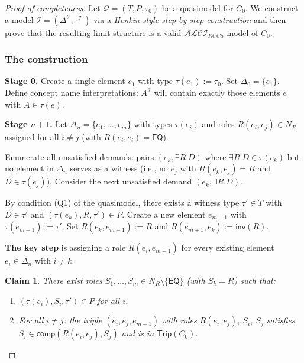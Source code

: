 \documentclass[a4paper,11pt]{article}
\newtheorem{claim}[theorem]{Claim}
\theoremstyle{definition}
\newcommand{\ALCIRCC}[1]{\ensuremath{\mathcal{ALCI}_{\mathit{RCC#1}}}}
\newcommand{\NR}{\ensuremath{N_R}}
\newcommand{\DeltaI}{\ensuremath{\Delta^{\mathcal{I}}}}
\newcommand{\interp}{\ensuremath{\mathcal{I}}}
\newcommand{\EQ}{\ensuremath{\mathsf{EQ}}}
\newcommand{\inv}{\ensuremath{\mathsf{inv}}}
\newcommand{\comp}{\ensuremath{\mathsf{comp}}}
\newcommand{\Trip}{\ensuremath{\mathsf{Trip}}}
\begin{document}
\begin{proof}[Proof of completeness]
Let $\mathcal{Q} = (T, P, \tau_0)$ be a quasimodel for $C_0$.  We
construct a model $\interp = (\DeltaI, \cdot^{\interp})$ via a
\emph{Henkin-style step-by-step construction} and then prove that the
resulting limit structure is a valid $\ALCIRCC{5}$ model of $C_0$.

\subsubsection*{The construction}

\medskip\noindent\textbf{Stage 0.}\;
Create a single element $e_1$ with type $\tau(e_1) := \tau_0$.
Set $\Delta_0 = \{e_1\}$.  Define concept name interpretations:
$A^{\interp}$ will contain exactly those elements $e$ with $A \in
\tau(e)$.

\medskip\noindent\textbf{Stage $n+1$.}\;
Let $\Delta_n = \{e_1, \ldots, e_m\}$ with types $\tau(e_i)$ and
roles $R(e_i, e_j) \in \NR$ assigned for all $i \neq j$ (with
$R(e_i, e_i) = \EQ$).

Enumerate all unsatisfied demands: pairs $(e_k, \exists R.D)$ where
$\exists R.D \in \tau(e_k)$ but no element in $\Delta_n$ serves as a
witness (i.e., no $e_j$ with $R(e_k, e_j) = R$ and $D \in
\tau(e_j)$).  Consider the next unsatisfied demand $(e_k, \exists
R.D)$.

By condition (Q1) of the quasimodel, there exists a witness type
$\tau' \in T$ with $D \in \tau'$ and $(\tau(e_k), R, \tau') \in P$.
Create a new element $e_{m+1}$ with $\tau(e_{m+1}) := \tau'$.  Set
$R(e_k, e_{m+1}) := R$ and $R(e_{m+1}, e_k) := \inv(R)$.

\medskip
\textbf{The key step} is assigning a role $R(e_i, e_{m+1})$ for
every existing element $e_i \in \Delta_n$ with $i \neq k$.

\begin{claim}
\label{claim:extension}
There exist roles $S_1, \ldots, S_m \in \NR \setminus \{\EQ\}$
\textup{(}with $S_k = R$\textup{)} such that:
\begin{enumerate}[label=(\alph*),nosep]
  \item $(\tau(e_i), S_i, \tau') \in P$ for all $i$.
  \item For all $i \neq j$: the triple $(e_i, e_j, e_{m+1})$ with
    roles $R(e_i, e_j)$, $S_i$, $S_j$ satisfies $S_i \in
    \comp(R(e_i, e_j), S_j)$ and is in $\Trip(C_0)$.
\end{enumerate}
\end{claim}


\end{proof}
\end{document}
